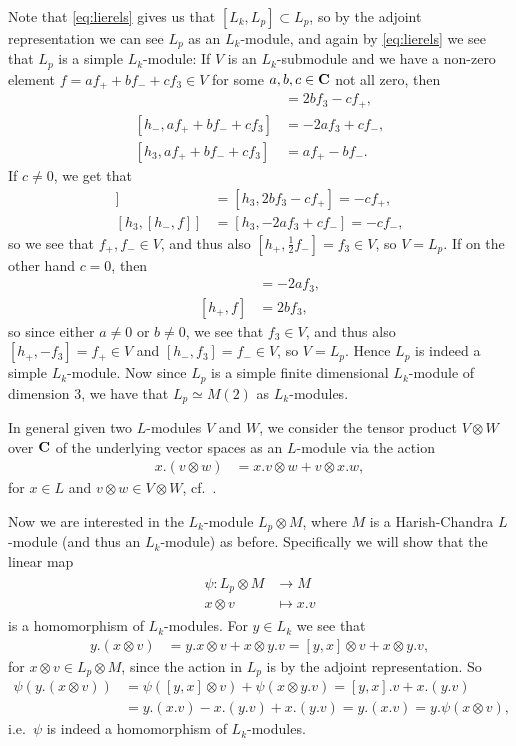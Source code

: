 Note that \cref{eq:lierels} gives us that $[L_k,L_p]\subset L_p$, so by the adjoint representation we can see $L_p$ as an $L_k$-module, and again by \cref{eq:lierels} we see that $L_p$ is a simple $L_k$-module: If $V$ is an $L_k$-submodule and we have a non-zero element $f=af_++bf_-+cf_3\in V$ for some $a,b,c\in\mathbf{C}$ not all zero, then
\begin{align*}
  [h_+,af_++bf_-+cf_3] &= 2bf_3-cf_+, \\
  [h_-,af_++bf_-+cf_3] &= -2af_3+cf_-, \\
  [h_3,af_++bf_-+cf_3] &= af_+-bf_-.
\end{align*}
If $c\neq0$, we get that
\begin{align*}
  [h_3,[h_+,f]] &= [h_3,2bf_3-cf_+] = -cf_+, \\
  [h_3,[h_-,f]] &= [h_3,-2af_3+cf_-] = -cf_-,
\end{align*}
so we see that $f_+,f_-\in V$, and thus also $[h_+,\tfrac{1}{2}f_-]=f_3\in V$, so $V=L_p$. If on the other hand $c=0$, then
\begin{align*}
  [h_-,f] &= -2af_3, \\
  [h_+,f] &= 2bf_3,
\end{align*}
so since either $a\neq 0$ or $b\neq 0$, we see that $f_3\in V$, and thus also $[h_+,-f_3]=f_+\in V$ and $[h_-,f_3]=f_-\in V$, so $V=L_p$. Hence $L_p$ is indeed a simple $L_k$-module. Now since $L_p$ is a simple finite dimensional $L_k$-module of dimension 3, we have that $L_p\simeq M(2)$ as $L_k$-modules.

In general given two $L$-modules $V$ and $W$, we consider the tensor product $V\otimes W$ over $\mathbf{C}$ of the underlying vector spaces as an $L$-module via the action
\begin{align*}
  x.(v\otimes w) &= x.v\otimes w + v\otimes x.w,
\end{align*}
for $x\in L$ and $v\otimes w\in V\otimes W$, cf.\ \cite[26]{humphrey}.

Now we are interested in the $L_k$-module $L_p\otimes M$, where $M$ is a Harish-Chandra $L$-module (and thus an $L_k$-module) as before. Specifically we will show that the linear map
\begin{align}
  \begin{split} \label{eq:psi}
    \psi \colon L_p\otimes M &\to M \\
    x\otimes v &\mapsto x.v
  \end{split}
\end{align}
is a homomorphism of $L_k$-modules. For $y\in L_k$ we see that
\begin{align*}
  y.(x\otimes v) &= y.x\otimes v + x\otimes y.v = [y,x]\otimes v + x\otimes y.v,
\end{align*}
for $x\otimes v\in L_p\otimes M$, since the action in $L_p$ is by the adjoint representation. So
\begin{align*}
  \psi(y.(x\otimes v)) &= \psi([y,x]\otimes v) + \psi(x\otimes y.v) = [y,x].v + x.(y.v) \\
  &= y.(x.v)-x.(y.v)+x.(y.v) = y.(x.v) = y.\psi(x\otimes v),
\end{align*}
i.e.\ $\psi$ is indeed a homomorphism of $L_k$-modules.

